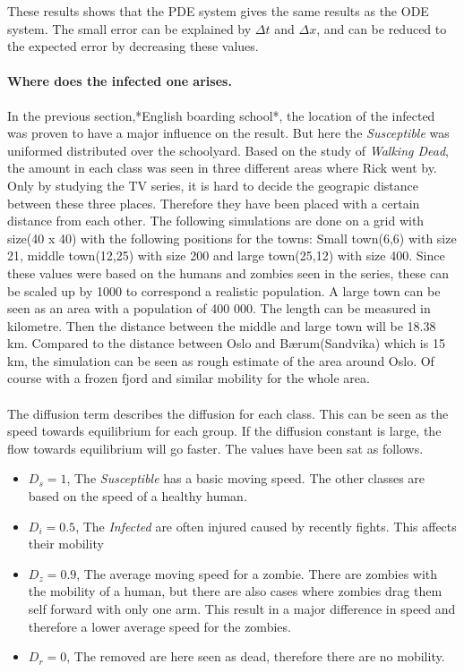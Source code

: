 \documentclass[%
twoside,                 %
final,                   %
10pt]{article}
\begin{document}
\noindent
These results shows that the PDE system gives the same results as the ODE system. The small error can be explained by $\Delta t$ and $\Delta x$, and can be reduced to the expected error by decreasing these values.



\paragraph{Where does the infected one arises.}
In the previous section,*English boarding school*, the location of the infected was proven to have a major influence on the result. But here the \emph{Susceptible} was uniformed distributed over the schoolyard. Based on the study of \emph{Walking Dead}, the amount in each class was seen in three different areas where Rick went by. Only by studying the TV series, it is hard to decide the geograpic distance between these three places. Therefore they have been placed with a certain distance from each other. The following simulations are done on a grid with size(40 x 40) with the following positions for the towns: Small town(6,6) with size 21, middle town(12,25) with size 200 and large town(25,12) with size 400. Since these values were based on the humans and zombies seen in the series, these can be scaled up by 1000 to correspond a realistic population. A large town can be seen as an area with a population of 400 000. The length can be measured in kilometre. Then the distance between the middle and large town will be 18.38 km. Compared to the distance between Oslo and Bærum(Sandvika) which is 15 km, the simulation can be seen as rough estimate of the area around Oslo. Of course with a frozen fjord and similar mobility for the whole area.  
\\
\\
The diffusion term describes the diffusion for each class. This can be seen as the speed towards equilibrium for each group. If the diffusion constant is large, the flow towards equilibrium will go faster. The values have been sat as follows. 
\begin{itemize}
\item $D_s=1$, The \emph{Susceptible} has a basic moving speed. The other classes are based on the speed of a healthy human.

\item $D_i=0.5$, The \emph{Infected} are often injured caused by recently fights. This affects their mobility

\item $D_z=0.9$, The average moving speed for a zombie. There are zombies with the mobility of a human, but there are also cases where zombies drag them self forward with only one arm. This result in a major difference in speed and therefore a lower average speed for the zombies.

\item $D_r=0$, The removed are here seen as dead, therefore there are no mobility.
\end{itemize}
\end{document}
